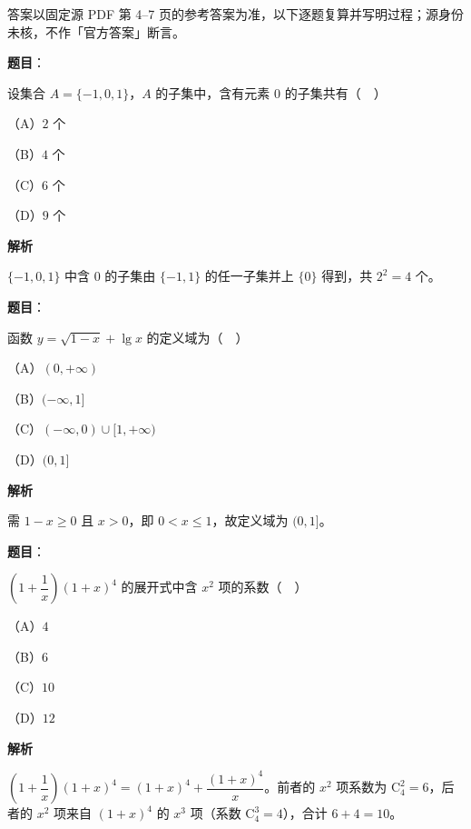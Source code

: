 

\begin{gktip}
答案以固定源 PDF 第 4–7 页的参考答案为准，以下逐题复算并写明过程；源身份未核，不作「官方答案」断言。
\end{gktip}

\begin{answer}

\textbf{题目}：

设集合 $A=\{-1,0,1\}$，$A$ 的子集中，含有元素 $0$ 的子集共有（　）

（A）$2$ 个

（B）$4$ 个

（C）$6$ 个

（D）$9$ 个

\textbf{解析}

$\{-1,0,1\}$ 中含 $0$ 的子集由 $\{-1,1\}$ 的任一子集并上 $\{0\}$ 得到，共 $2^2=4$ 个。


\end{answer}
\begin{answer}

\textbf{题目}：

函数 $y=\sqrt{1-x}+\lg x$ 的定义域为（　）

（A）$(0,+\infty)$

（B）$(-\infty,1]$

（C）$(-\infty,0)\cup[1,+\infty)$

（D）$(0,1]$

\textbf{解析}

需 $1-x\geqslant0$ 且 $x>0$，即 $0<x\leqslant1$，故定义域为 $(0,1]$。


\end{answer}
\begin{answer}

\textbf{题目}：

$\left(1+\dfrac1x\right)(1+x)^4$ 的展开式中含 $x^2$ 项的系数（　）

（A）$4$

（B）$6$

（C）$10$

（D）$12$

\textbf{解析}

$\left(1+\dfrac1x\right)(1+x)^4=(1+x)^4+\dfrac{(1+x)^4}x$。前者的 $x^2$ 项系数为 $\mathrm C_4^2=6$，后者的 $x^2$ 项来自 $(1+x)^4$ 的 $x^3$ 项（系数 $\mathrm C_4^3=4$），合计 $6+4=10$。


\end{answer}

